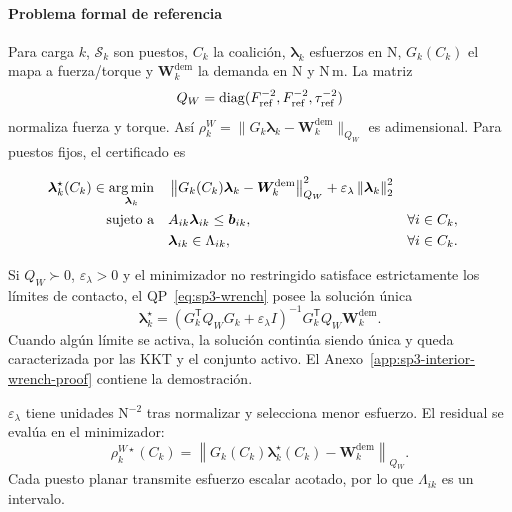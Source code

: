\paragraph{Problema formal de referencia}

Para carga $k$, $\mathcal S_k$ son puestos, $C_k$ la coalición, $\boldsymbol\lambda_k$ esfuerzos en N, $G_k(C_k)$ el mapa a fuerza/torque y $\boldsymbol W_k^{\mathrm{dem}}$ la demanda en N y N\,m. La matriz
\[
  Q_W=\operatorname{diag}(F_{\mathrm{ref}}^{-2},F_{\mathrm{ref}}^{-2},\tau_{\mathrm{ref}}^{-2})
\]
normaliza fuerza y torque. Así $\rho_k^W=\|G_k\boldsymbol\lambda_k-\boldsymbol W_k^{\mathrm{dem}}\|_{Q_W}$ es adimensional. Para puestos fijos, el certificado es

\begin{equation}
\label{eq:sp3-wrench}
\begin{aligned}
  \boldsymbol\lambda_k^\star(C_k)\in
  \operatorname*{arg\,min}_{\boldsymbol\lambda_k}\quad
  & \left\|G_k(C_k)\boldsymbol\lambda_k-\boldsymbol W_k^{\mathrm{dem}}\right\|_{Q_W}^{2}
    +\varepsilon_\lambda\left\|\boldsymbol\lambda_k\right\|_2^2 \\
  \text{sujeto a}\quad
  & A_{ik}\boldsymbol\lambda_{ik}\leq\boldsymbol b_{ik}, && \forall i\in C_k,\\
  & \boldsymbol\lambda_{ik}\in\Lambda_{ik}, && \forall i\in C_k.
\end{aligned}
\end{equation}

\begin{corolario}
\label{cor:sp3-interior-wrench-allocation}
Si $Q_W\succ0$, $\varepsilon_\lambda>0$ y el minimizador no restringido satisface estrictamente los límites de contacto, el QP~\eqref{eq:sp3-wrench} posee la solución única
\begin{equation}
\label{eq:sp3-interior-wrench-solution}
 \boldsymbol\lambda_k^\star=
 \left(G_k^{\mathsf T}Q_WG_k+\varepsilon_\lambda I\right)^{-1}
 G_k^{\mathsf T}Q_W\boldsymbol W_k^{\mathrm{dem}}.
\end{equation}
Cuando algún límite se activa, la solución continúa siendo única y queda caracterizada por las KKT y el conjunto activo. El Anexo~\ref{app:sp3-interior-wrench-proof} contiene la demostración.
\end{corolario}

$\varepsilon_\lambda$ tiene unidades N$^{-2}$ tras normalizar y selecciona menor esfuerzo. El residual se evalúa en el minimizador:
\begin{equation}
  \rho_k^{W\star}(C_k)=
  \left\|G_k(C_k)\boldsymbol\lambda_k^\star(C_k)
  -\boldsymbol W_k^{\mathrm{dem}}\right\|_{Q_W}.
  \label{eq:sp3-certified-residual}
\end{equation}
Cada puesto planar transmite esfuerzo escalar acotado, por lo que $\Lambda_{ik}$ es un intervalo.

